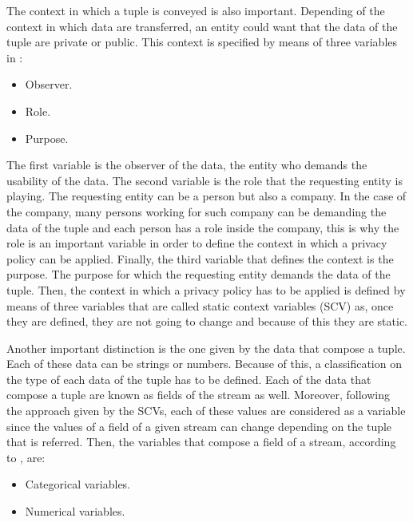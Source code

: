 The context in which a tuple is conveyed is also important. Depending of the context in which data are transferred, an entity could want that the data of the tuple are private or public. This context is specified by means of three variables in \cite{privacypoliciesarticle}:

\begin{itemize}

\item Observer.
\item Role.
\item Purpose.

\end{itemize}

The first variable is the observer of the data, the entity who demands the usability of the data. The second variable is the role that the requesting entity is playing. The requesting entity can be a person but also a company. In the case of the company, many persons working for such company can be demanding the data of the tuple and each person has a role inside the company, this is why the role is an important variable in order to define the context in which a privacy policy can be applied. Finally, the third variable that defines the context is the purpose. The purpose for which the requesting entity demands the data of the tuple. Then, the context in which a privacy policy has to be applied is defined by means of three variables that are called static context variables (SCV) as, once they are defined, they are not going to change and because of this they are static.

Another important distinction is the one given by the data that compose a tuple. Each of these data can be strings or numbers. Because of this, a classification on the type of each data of the tuple has to be defined. Each of the data that compose a tuple are known as fields of the stream as well. Moreover, following the approach given by the SCVs, each of these values are considered as a variable since the values of a field of a given stream can change depending on the tuple that is referred. Then, the variables that compose a field of a stream, according to \cite{privacypoliciesarticle}, are:

\begin{itemize}

\item Categorical variables.
\item Numerical variables.

\end{itemize}

